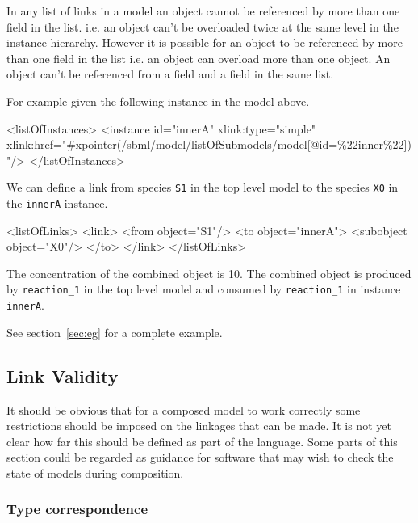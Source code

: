 \documentclass{cekarticle}
\begin{document}
In any list of links in a model an object cannot be referenced by more than one  field in the list.
i.e. an object can't be overloaded twice at the same level in the instance hierarchy.  However it is possible for an object
to be referenced by more than one  field in the list i.e. an object can overload more than one object.
An object can't be referenced from a  field and a  field in the same list.

For example given the following instance in the model above.

\begin{example}
<listOfInstances>
    <instance
        id="innerA"
        xlink:type="simple"
        xlink:href="#xpointer(/sbml/model/listOfSubmodels/model[@id=\%22inner\%22])"/>
</listOfInstances>
\end{example}

We can define a link from species \texttt{S1} in the top level model to the species \texttt{X0} in the \texttt{innerA} instance.

\begin{example}
<listOfLinks>
    <link>
        <from object="S1"/>
        <to object="innerA">
            <subobject object="X0"/>
        </to>
    </link>
</listOfLinks>
\end{example}

The concentration of the combined object is 10.  The combined object is produced by \texttt{reaction\_1} in the top level model and
consumed by \texttt{reaction\_1} in instance \texttt{innerA}.

See section~\ref{sec:eg} for a complete example.

\subsection{Link Validity}
\label{sec:linkvalidity}

It should be obvious that for a composed model to work correctly some restrictions
should be imposed on the linkages that can be made.  It is not yet clear how far this
should be defined as part of the language.  Some parts of this section could be regarded
as guidance for software that may wish to check the state of models during composition.

\subsubsection{Type correspondence}
\label{sec:typecorrespondence}
\end{document}
